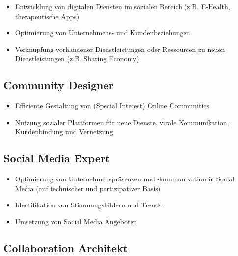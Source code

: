 \begin{itemize}
\tightlist
\item
  Entwicklung von digitalen Diensten im sozialen Bereich (z.B. E-Health,
  therapeutische Apps)
\item
  Optimierung von Unternehmens- und Kundenbeziehungen
\item
  Verknüpfung vorhandener Dienstleistungen oder Ressourcen zu neuen
  Dienstleistungen (z.B. Sharing Economy)
\end{itemize}

\subsection*{Community
Designer\label{/mi-2017/modulbeschreibungen-master/schwerpunkt-soziotechnische-systeme}}\label{community-designerpathlabelmi-2017modulbeschreibungen-masterschwerpunkt-soziotechnische-systeme}

\begin{itemize}
\tightlist
\item
  Effiziente Gestaltung von (Special Interest) Online Communities
\item
  Nutzung sozialer Plattformen für neue Dienste, virale Kommunikation,
  Kundenbindung und Vernetzung
\end{itemize}

\subsection*{Social Media
Expert\label{/mi-2017/modulbeschreibungen-master/schwerpunkt-soziotechnische-systeme}}\label{social-media-expertpathlabelmi-2017modulbeschreibungen-masterschwerpunkt-soziotechnische-systeme}

\begin{itemize}
\tightlist
\item
  Optimierung von Unternehmenspräsenzen und -kommunikation in Social
  Media (auf technischer und partizipativer Basis)
\item
  Identifikation von Stimmungsbildern und Trends
\item
  Umsetzung von Social Media Angeboten
\end{itemize}

\subsection*{Collaboration
Architekt\label{/mi-2017/modulbeschreibungen-master/schwerpunkt-soziotechnische-systeme}}\label{collaboration-architektpathlabelmi-2017modulbeschreibungen-masterschwerpunkt-soziotechnische-systeme}

